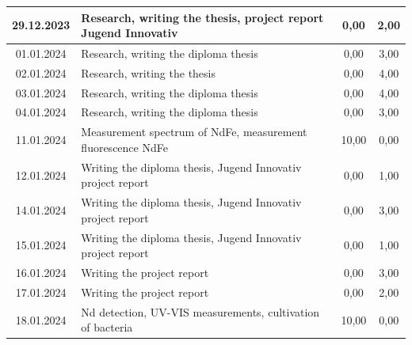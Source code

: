 \begin{longtable}{|c|p{7cm}|c|c|}
    29.12.2023    & Research, writing the thesis, project report Jugend Innovativ                                                   & 0,00                 & 2,00              \\ \hline
    01.01.2024    & Research, writing the diploma thesis                                                                            & 0,00                 & 3,00              \\ \hline
    02.01.2024    & Research, writing the thesis                                                                                    & 0,00                 & 4,00              \\ \hline
    03.01.2024    & Research, writing the diploma thesis                                                                            & 0,00                 & 4,00              \\ \hline
    04.01.2024    & Research, writing the diploma thesis                                                                            & 0,00                 & 3,00              \\ \hline
    11.01.2024    & Measurement spectrum of NdFe, measurement fluorescence NdFe                                                     & 10,00                & 0,00              \\ \hline
    12.01.2024    & Writing the diploma thesis, Jugend Innovativ project report                                                     & 0,00                 & 1,00              \\ \hline
    14.01.2024    & Writing the diploma thesis, Jugend Innovativ project report                                                     & 0,00                 & 3,00              \\ \hline
    15.01.2024    & Writing the diploma thesis, Jugend Innovativ project report                                                     & 0,00                 & 1,00              \\ \hline
    16.01.2024    & Writing the project report                                                                                      & 0,00                 & 3,00              \\ \hline
    17.01.2024    & Writing the project report                                                                                      & 0,00                 & 2,00              \\ \hline
    18.01.2024    & Nd detection, UV-VIS measurements, cultivation of bacteria                                                      & 10,00                & 0,00              \\ \hline

\end{longtable}
